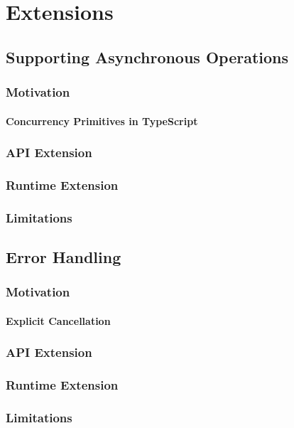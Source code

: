 \chapter{Extensions}

\section{Supporting Asynchronous Operations}

\subsection{Motivation}

\subsubsection{Concurrency Primitives in TypeScript}

\subsection{API Extension}

\subsection{Runtime Extension}

\subsection{Limitations}

\section{Error Handling}

\subsection{Motivation}

\subsubsection{Explicit Cancellation}

\subsection{API Extension}

\subsection{Runtime Extension}

\subsection{Limitations}